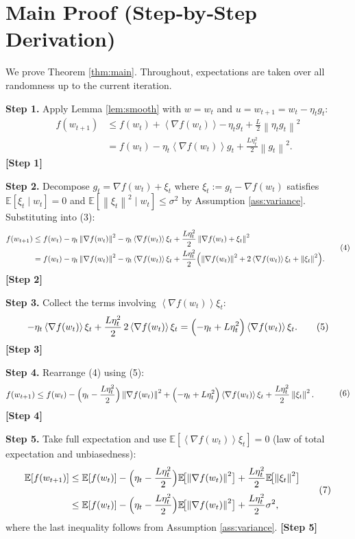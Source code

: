 \documentclass{article}
\newcommand{\E}{\mathbb{E}}
\newcommand{\norm}[1]{\left\lVert #1\right\rVert}
\newcommand{\inner}[1]{\left\langle #1\right\rangle}
\begin{document}
\section*{Main Proof (Step‑by‑Step Derivation)}
We prove Theorem \ref{thm:main}.  Throughout, expectations are taken over all randomness up to the current iteration.

\noindent\textbf{Step 1.} Apply Lemma \ref{lem:smooth} with $w=w_{t}$ and $u=w_{t+1}=w_{t}-\eta_{t}g_{t}$:
\[
\begin{aligned}
f(w_{t+1})
&\le f(w_{t})+\inner{\nabla f(w_{t})}{-\,\eta_{t}g_{t}}
   +\frac{L}{2}\norm{\eta_{t}g_{t}}^{2}\\[2mm]
&= f(w_{t})-\eta_{t}\inner{\nabla f(w_{t})}{g_{t}}
   +\frac{L\eta_{t}^{2}}{2}\norm{g_{t}}^{2}.
\end{aligned}
\tag{3}
\]
\textbf{[Step 1]}

\noindent\textbf{Step 2.} Decompose $g_{t}=\nabla f(w_{t})+ \xi_{t}$ where $\xi_{t}:=g_{t}-\nabla f(w_{t})$ satisfies $\E[\xi_{t}\mid w_{t}]=0$ and $\E[\norm{\xi_{t}}^{2}\mid w_{t}]\le\sigma^{2}$ by Assumption \ref{ass:variance}.  Substituting into (3):
\[
\begin{aligned}
f(w_{t+1})
&\le f(w_{t})-\eta_{t}\norm{\nabla f(w_{t})}^{2}
      -\eta_{t}\inner{\nabla f(w_{t})}{\xi_{t}}
      +\frac{L\eta_{t}^{2}}{2}\norm{\nabla f(w_{t})+\xi_{t}}^{2}\\
&= f(w_{t})-\eta_{t}\norm{\nabla f(w_{t})}^{2}
      -\eta_{t}\inner{\nabla f(w_{t})}{\xi_{t}}
      +\frac{L\eta_{t}^{2}}{2}\Bigl(
          \norm{\nabla f(w_{t})}^{2}
          +2\inner{\nabla f(w_{t})}{\xi_{t}}
          +\norm{\xi_{t}}^{2}\Bigr).
\end{aligned}
\tag{4}
\]
\textbf{[Step 2]}

\noindent\textbf{Step 3.} Collect the terms involving $\inner{\nabla f(w_{t})}{\xi_{t}}$:
\[
-\eta_{t}\inner{\nabla f(w_{t})}{\xi_{t}}
+\frac{L\eta_{t}^{2}}{2}\,2\inner{\nabla f(w_{t})}{\xi_{t}}
=
\Bigl(-\eta_{t}+L\eta_{t}^{2}\Bigr)\inner{\nabla f(w_{t})}{\xi_{t}}.
\tag{5}
\]
\textbf{[Step 3]}

\noindent\textbf{Step 4.} Rearrange (4) using (5):
\[
\begin{aligned}
f(w_{t+1})
&\le f(w_{t})
   -\Bigl(\eta_{t}-\frac{L\eta_{t}^{2}}{2}\Bigr)\norm{\nabla f(w_{t})}^{2}
   +\Bigl(-\eta_{t}+L\eta_{t}^{2}\Bigr)\inner{\nabla f(w_{t})}{\xi_{t}}
   +\frac{L\eta_{t}^{2}}{2}\norm{\xi_{t}}^{2}.
\end{aligned}
\tag{6}
\]
\textbf{[Step 4]}

\noindent\textbf{Step 5.} Take full expectation and use $\E[\inner{\nabla f(w_{t})}{\xi_{t}}]=0$ (law of total expectation and unbiasedness):
\[
\begin{aligned}
\E[f(w_{t+1})]
&\le \E[f(w_{t})]
   -\Bigl(\eta_{t}-\frac{L\eta_{t}^{2}}{2}\Bigr)\E\!\bigl[\norm{\nabla f(w_{t})}^{2}\bigr]
   +\frac{L\eta_{t}^{2}}{2}\E\!\bigl[\norm{\xi_{t}}^{2}\bigr] \\[1mm]
&\le \E[f(w_{t})]
   -\Bigl(\eta_{t}-\frac{L\eta_{t}^{2}}{2}\Bigr)\E\!\bigl[\norm{\nabla f(w_{t})}^{2}\bigr]
   +\frac{L\eta_{t}^{2}}{2}\sigma^{2},
\end{aligned}
\tag{7}
\]
where the last inequality follows from Assumption \ref{ass:variance}.
\textbf{[Step 5]}
\end{document}
